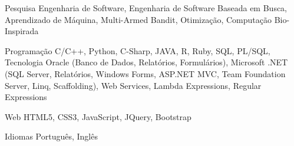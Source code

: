 

\begin{cvskills}

  \cvskill
    {Pesquisa} %
    {Engenharia de Software, Engenharia de Software Baseada em Busca, Aprendizado de Máquina, Multi-Armed Bandit, Otimização, Computação Bio-Inspirada} %

  \cvskill
    {Programação} %
    {C/C++, Python, C-Sharp, JAVA, R, Ruby, SQL, PL/SQL, Tecnologia Oracle (Banco de Dados, Relatórios, Formulários), Microsoft .NET (SQL Server, Relatórios, Windows Forms, ASP.NET MVC, Team Foundation Server, Linq, Scaffolding), Web Services, Lambda Expressions, Regular Expressions} %

  \cvskill
    {Web} %
    {HTML5, CSS3, JavaScript, JQuery, Bootstrap} %

  \cvskill
    {Idiomas} %
    {Português, Inglês} %

\end{cvskills}
